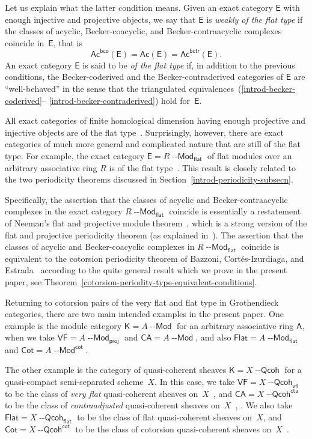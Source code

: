 \documentclass[12pt,a4paper]{amsart}
\newcommand{\+}{\nobreakdash-}
\renewcommand{\:}{\colon}
\newcommand{\Modl}{{\operatorname{\mathsf{--Mod}}}}
\newcommand{\Qcoh}{{\operatorname{\mathsf{--Qcoh}}}}
\newcommand{\sA}{\mathsf A}
\newcommand{\sE}{\mathsf E}
\newcommand{\sK}{\mathsf K}
\newcommand{\VF}{\mathsf{VF}}
\newcommand{\CA}{\mathsf{CA}}
\newcommand{\Flat}{\mathsf{Flat}}
\newcommand{\Cot}{\mathsf{Cot}}
\newcommand{\Ac}{\mathsf{Ac}}
\newcommand{\proj}{\mathsf{proj}}
\renewcommand{\flat}{\mathsf{flat}}
\renewcommand{\cot}{\mathsf{cot}}
\newcommand{\vfl}{\mathsf{vfl}}
\newcommand{\cta}{\mathsf{cta}}
\newcommand{\bco}{\mathsf{bco}}
\newcommand{\bctr}{\mathsf{bctr}}
\theoremstyle{plain}
\theoremstyle{definition}
\begin{document}
 Let us explain what the latter condition means.
 Given an exact category $\sE$ with enough injective and projective
objects, we say that $\sE$ is \emph{weakly of the flat type} if
the classes of acyclic, Becker-coacyclic, and Becker-contraacyclic
complexes coincide in~$\sE$, that is
$$
 \Ac^\bco(\sE)=\Ac(\sE)=\Ac^\bctr(\sE).
$$
 An exact category $\sE$ is said to be \emph{of the flat type} if,
in addition to the previous conditions, the Becker-coderived and
the Becker-contraderived categories of $\sE$ are ``well-behaved''
in the sense that the triangulated
equivalences~(\ref{introd-becker-coderived}\+-%
\ref{introd-becker-contraderived}) hold for~$\sE$.

 All exact categories of finite homological dimension having enough
projective and injective objects are of the flat
type~\cite[Proposition~7.5]{Pphil}.
 Surprisingly, however, there are exact categories of much more
general and complicated nature that are still of the flat type.
 For example, the exact category $\sE=R\Modl_\flat$ of flat modules
over an arbitrary associative ring $R$ is of the flat
type~\cite[Theorems~7.14 and~7.18]{Pphil}.
 This result is closely related to the two periodicity theorems
discussed in Section~\ref{introd-periodicity-subsecn}.

 Specifically, the assertion that the classes of acyclic and
Becker-contraacyclic complexes in the exact category $R\Modl_\flat$
coincide is essentially a restatement of Neeman's flat and projective
module theorem~\cite[Theorem~8.6\,(i)\,$\Leftrightarrow$\,(3)]{Neem},
which is a strong version of the flat and projective periodicity
theorem (as explained in~\cite[Remark~2.15]{Neem}).
 The assertion that the classes of acyclic and Becker-coacyclic
complexes in $R\Modl_\flat$ coincide is equivalent to the cotorsion
periodicity theorem of Bazzoni, Cort\'es-Izurdiaga, and
Estrada~\cite{BCE} according to the quite general result which
we prove in the present paper, see
Theorem~\ref{cotorsion-periodity-type-equivalent-conditions}.
{\par}

 Returning to cotorsion pairs of the very flat and flat type in
Grothendieck categories, there are two main intended examples
in the present paper.
 One example is the module category $\sK=A\Modl$ for an arbitrary
associative ring $\sA$, when we take $\VF=A\Modl_\proj$ and
$\CA=A\Modl$, and also $\Flat=A\Modl_\flat$ and $\Cot=A\Modl^\cot$.

 The other example is the category of quasi-coherent sheaves
$\sK=X\Qcoh$ for a quasi-compact semi-separated scheme~$X$.
 In this case, we take $\VF=X\Qcoh_\vfl$ to be the class of
\emph{very flat} quasi-coherent sheaves on~$X$
\,\cite[Section~1.10]{Pcosh}, \cite[Section~0.5]{PSl1} and
$\CA=X\Qcoh^\cta$ to be the class of \emph{contraadjusted}
quasi-coherent sheaves on~$X$
\,\cite[Sections~2.5 and~4.1]{Pcosh}, \cite[Section~3.5]{PRoos}.
 We also take $\Flat=X\Qcoh_\flat$ to be the class of flat
quasi-coherent sheaves on~$X$, and $\Cot=X\Qcoh^\cot$ to be the class
of cotorsion quasi-coherent sheaves on~$X$ \,\cite{EE}.
\end{document}

